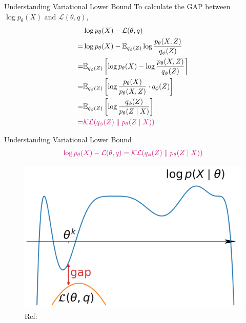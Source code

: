 \documentclass{beamer}
\begin{document}
\begin{frame}{Understanding Variational Lower Bound}
To calculate the GAP between $\log p_{\theta}(X)$ and $\mathcal{L}(\theta,q)$,%
\begin{align*}
  &\log p_{\theta}(X)-\mathcal{L}(\theta,q)\\
  =&\log p_{\theta}(X)
  -\mathbb{E}_{q_{\phi}(Z)}\log\frac{p_{\theta}(X,Z)}{q_{\phi}(Z)}\\
  =&\mathbb{E}_{q_{\phi}(Z)}\left[
  \log p_{\theta}(X)-\log\frac{p_{\theta}(X,Z)}{q_{\phi}(Z)}\right]\\
  =&\mathbb{E}_{q_{\phi}(Z)}\left
  [\log\frac{p_{\theta}(X)}{p_{\theta}(X,Z)}\cdot q_{\phi}(Z)\right]\\
  =&\mathbb{E}_{q_{\phi}(Z)}\left
  [\log\frac{q_{\phi}(Z)}{p_{\theta}(Z\mid X)}\right]\\
  =&\textcolor{DeepPink3}{\mathcal{KL}(q_{\phi}(Z)\parallel p_{\theta}(Z\mid X))}
\end{align*}
\end{frame}
\begin{frame}{Understanding Variational Lower Bound}
$$\textcolor{DeepPink3}{\log p_{\theta}(X)-\mathcal{L}(\theta,q)
=\mathcal{KL}(q_{\phi}(Z)\parallel p_{\theta}(Z\mid X))}$$
\begin{figure}
    \centering
    \includegraphics[width=0.64\columnwidth]{gap/gap-GAP.png}
    \caption{\textcolor{BGpurple}{Ref: \cite{bayesML}}}
\end{figure}
\end{frame}
\end{document}
